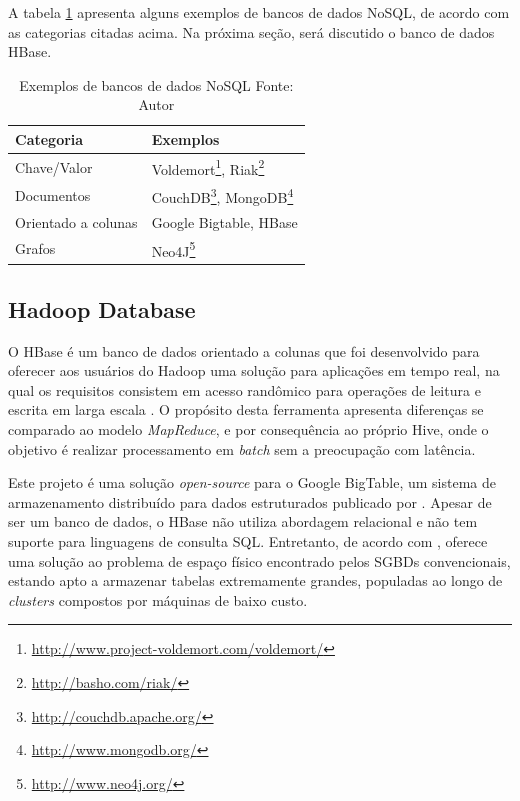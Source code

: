A tabela \ref{tab-nosql} apresenta alguns exemplos de bancos de dados NoSQL, de acordo com as categorias citadas acima. Na próxima seção, será discutido o banco de dados HBase.

\begin{savenotes}
\begin{table}[!ht]
\begin{center}
  \begin{tabular}{|p{5cm}|p{3cm}|}
	\hline
	Categoria & Exemplos
	\\ \hline
	Chave/Valor & Voldemort\footnote{\url{http://www.project-voldemort.com/voldemort/}}, Riak\footnote{\url{http://basho.com/riak/}}
	\\ \hline
	Documentos & CouchDB\footnote{\url{http://couchdb.apache.org/}}, MongoDB\footnote{\url{http://www.mongodb.org/}}
	\\ \hline
	Orientado a colunas & Google Bigtable, HBase
	\\ \hline
	Grafos & Neo4J\footnote{\url{http://www.neo4j.org/}}
	\\ \hline
  \end{tabular}
  \captionsetup{justification=centering}
  \caption[Exemplos de bancos de dados NoSQL]{Exemplos de bancos de dados NoSQL
  \protect\linebreak Fonte: Autor}
\label{tab-nosql}
\end{center}
\end{table}
\end{savenotes}
\FloatBarrier

\subsection{Hadoop Database}

O HBase é um banco de dados orientado a colunas que foi desenvolvido para oferecer aos usuários do Hadoop uma solução para aplicações em tempo real, na qual os requisitos consistem em acesso randômico para operações de leitura e escrita em larga escala \cite{white2012}. O propósito desta ferramenta apresenta diferenças se comparado ao modelo \textit{MapReduce}, e por consequência ao próprio Hive, onde o objetivo é realizar processamento em \textit{batch} sem a preocupação com latência.

Este projeto é uma solução \textit{open-source} para o Google BigTable, um sistema de armazenamento distribuído para dados estruturados publicado por . Apesar de ser um banco de dados, o HBase não utiliza abordagem relacional e não tem suporte para linguagens de consulta SQL. Entretanto, de acordo com , oferece uma solução ao problema de espaço físico encontrado pelos SGBDs convencionais, estando apto a armazenar tabelas extremamente grandes, populadas ao longo de \textit{clusters} compostos por máquinas de baixo custo.

